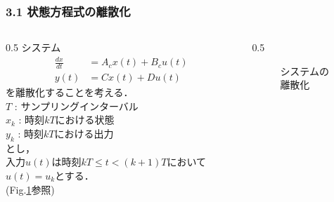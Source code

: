 


\begin{frame}[t]
\frametitle{3.1 状態方程式の離散化}
\begin{columns}[t]
\begin{column}{0.5\textwidth}
システム
\begin{align}
 \frac{dx}{dt} &= A_c x(t) + B_c u(t) \label{c_state_eq} \\
 y(t)          &= C x(t) + D u(t) \label{c_output_eq}
\end{align}
を離散化することを考える．\\
$T$ : サンプリングインターバル\\
$x_k$ : 時刻$kT$における状態\\
$y_k$ : 時刻$kT$における出力\\
とし，\\
入力$u(t)$は時刻$kT \leq t < (k+1)T$において$u(t) = u_k$とする．\\
(Fig.\ref{fig_discrete_signal}参照)
\end{column}

\begin{column}{0.5\textwidth}
\begin{figure}[htbp]
 \begin{center}
 	\scalebox{0.5}{
  }
  \caption{システムの離散化}
  \label{fig_discrete_signal}
 \end{center}
\end{figure}
\end{column}
\end{columns}

\end{frame}


